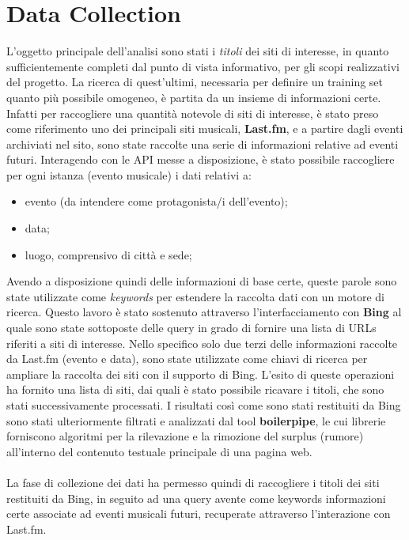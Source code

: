\documentclass[a4paper]{report}
\begin{document}
\section{Data Collection}
L'oggetto principale dell'analisi sono stati i \textit{titoli} dei siti di interesse, in quanto sufficientemente completi dal punto di vista informativo, per gli scopi realizzativi del progetto. La ricerca di quest'ultimi, necessaria per definire un training set quanto più possibile omogeneo, è partita da un insieme di informazioni certe. Infatti per raccogliere una quantità notevole di siti di interesse, è stato preso come riferimento uno dei principali siti musicali, \textbf{Last.fm}\cite{6}, e a partire dagli eventi archiviati nel sito, sono state raccolte una serie di informazioni relative ad eventi futuri. Interagendo con le API messe a disposizione, è stato possibile raccogliere per ogni istanza (evento musicale) i dati relativi a:
\begin{itemize}
\item evento (da intendere come protagonista/i dell'evento);
\item data;
\item luogo, comprensivo di città e sede;
\end{itemize}
Avendo a disposizione quindi delle informazioni di base certe, queste parole sono state utilizzate come \textit{keywords} per estendere la raccolta dati con un motore di ricerca. Questo lavoro è stato sostenuto attraverso l'interfacciamento con \textbf{Bing} al quale sono state sottoposte delle query in grado di fornire una lista di URLs riferiti a siti di interesse. Nello specifico solo due terzi delle informazioni raccolte da Last.fm (evento e data), sono state utilizzate come chiavi di ricerca per ampliare la raccolta dei siti con il supporto di Bing. L'esito di queste operazioni ha fornito una lista di siti, dai quali è stato possibile ricavare i titoli, che sono stati successivamente processati. I risultati così come sono stati restituiti da Bing sono stati ulteriormente filtrati e analizzati dal tool \textbf{boilerpipe}\cite{7}, le cui librerie forniscono algoritmi per la rilevazione e la rimozione del surplus (rumore) all'interno del contenuto testuale principale di una pagina web. \\
\\
La fase di collezione dei dati ha permesso quindi di raccogliere i titoli dei siti restituiti da Bing, in seguito ad una query avente come keywords informazioni certe associate ad eventi musicali futuri, recuperate attraverso l'interazione con Last.fm.
\end{document}
